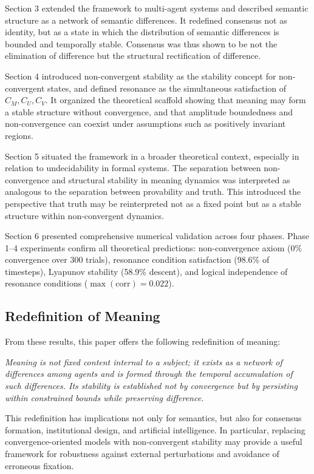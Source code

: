 \documentclass[11pt,a4paper]{article}
\theoremstyle{definition}
\begin{document}
Section 3 extended the framework to multi-agent systems and described semantic structure as a network of semantic differences. It redefined consensus not as identity, but as a state in which the distribution of semantic differences is bounded and temporally stable. Consensus was thus shown to be not the elimination of difference but the structural rectification of difference.

Section 4 introduced non-convergent stability as the stability concept for non-convergent states, and defined resonance as the simultaneous satisfaction of $C_M, C_U, C_V$. It organized the theoretical scaffold showing that meaning may form a stable structure without convergence, and that amplitude boundedness and non-convergence can coexist under assumptions such as positively invariant regions.

Section 5 situated the framework in a broader theoretical context, especially in relation to undecidability in formal systems. The separation between non-convergence and structural stability in meaning dynamics was interpreted as analogous to the separation between provability and truth. This introduced the perspective that truth may be reinterpreted not as a fixed point but as a stable structure within non-convergent dynamics.

Section 6 presented comprehensive numerical validation across four phases. Phase 1--4 experiments confirm all theoretical predictions: non-convergence axiom ($0\%$ convergence over 300 trials), resonance condition satisfaction (98.6\% of timesteps), Lyapunov stability (58.9\% descent), and logical independence of resonance conditions ($\max(\text{corr}) = 0.022$).

\subsection{Redefinition of Meaning}

From these results, this paper offers the following redefinition of meaning:

\textit{Meaning is not fixed content internal to a subject; it exists as a network of differences among agents and is formed through the temporal accumulation of such differences. Its stability is established not by convergence but by persisting within constrained bounds while preserving difference.}

This redefinition has implications not only for semantics, but also for consensus formation, institutional design, and artificial intelligence. In particular, replacing convergence-oriented models with non-convergent stability may provide a useful framework for robustness against external perturbations and avoidance of erroneous fixation.
\end{document}
